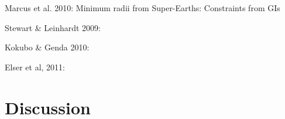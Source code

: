 \cite{2010ApJ...712L..73M}
Marcus et al. 2010: Minimum radii from Super-Earths: Constraints from GIs

\cite{Stewart:2009p3265}
Stewart \& Leinhardt 2009:

\cite{2010ApJ...714L..21K}
Kokubo \& Genda 2010:

\cite{2011arXiv1105.4616E}
Elser et al, 2011:

\section{Discussion}






